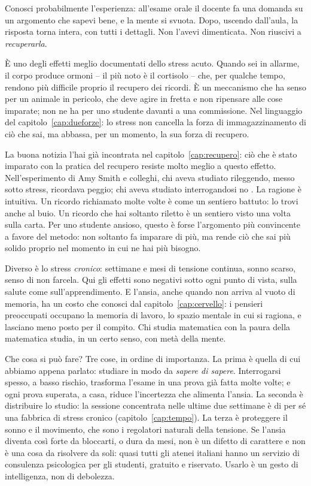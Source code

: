 Conosci probabilmente l'esperienza: all'esame orale il docente fa una
domanda su un argomento che sapevi bene, e la mente si svuota. Dopo,
uscendo dall'aula, la risposta torna intera, con tutti i dettagli. Non
l'avevi dimenticata. Non riuscivi a \emph{recuperarla}.

È uno degli effetti meglio documentati dello stress acuto. Quando sei
in allarme, il corpo produce ormoni -- il più noto è il cortisolo --
che, per qualche tempo, rendono più difficile proprio il recupero dei
ricordi. È un meccanismo che ha senso per un animale in pericolo, che
deve agire in fretta e non ripensare alle cose imparate; non ne ha per
uno studente davanti a una commissione. Nel linguaggio del
capitolo~\ref{cap:dueforze}: lo stress non cancella la forza di
immagazzinamento di ciò che sai, ma abbassa, per un momento, la sua
forza di recupero.

La buona notizia l'hai già incontrata nel capitolo~\ref{cap:recupero}:
ciò che è stato imparato con la pratica del recupero resiste molto
meglio a questo effetto. Nell'esperimento di Amy Smith e colleghi, chi
aveva studiato rileggendo, messo sotto stress, ricordava peggio; chi
aveva studiato interrogandosi no \parencite{smith2016}. La ragione è
intuitiva. Un ricordo richiamato molte volte è come un sentiero
battuto: lo trovi anche al buio. Un ricordo che hai soltanto riletto è
un sentiero visto una volta sulla carta. Per uno studente ansioso,
questo è forse l'argomento più convincente a favore del metodo: non
soltanto fa imparare di più, ma rende ciò che sai più solido proprio
nel momento in cui ne hai più bisogno.

Diverso è lo stress \emph{cronico}: settimane e mesi di tensione
continua, sonno scarso, senso di non farcela. Qui gli effetti sono
negativi sotto ogni punto di vista, sulla salute come
sull'apprendimento. E l'ansia, anche quando non arriva al vuoto di
memoria, ha un costo che conosci dal capitolo~\ref{cap:cervello}: i
pensieri preoccupati occupano la memoria di lavoro, lo spazio mentale
in cui si ragiona, e lasciano meno posto per il compito. Chi studia
matematica con la paura della matematica studia, in un certo senso,
con metà della mente.

Che cosa si può fare? Tre cose, in ordine di importanza. La prima è
quella di cui abbiamo appena parlato: studiare in modo da
\emph{sapere di sapere}. Interrogarsi spesso, a basso rischio, trasforma
l'esame in una prova già fatta molte volte; e ogni prova superata, a
casa, riduce l'incertezza che alimenta l'ansia. La seconda è
distribuire lo studio: la sessione concentrata nelle ultime due
settimane è di per sé una fabbrica di stress cronico
(capitolo~\ref{cap:tempo}). La terza è proteggere il sonno e il
movimento, che sono i regolatori naturali della tensione. Se l'ansia
diventa così forte da bloccarti, o dura da mesi, non è un difetto di
carattere e non è una cosa da risolvere da soli: quasi tutti gli
atenei italiani hanno un servizio di consulenza psicologica per gli
studenti, gratuito e riservato. Usarlo è un gesto di intelligenza, non
di debolezza.

